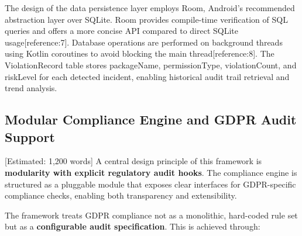 The design of the data persistence layer employs Room, Android's recommended abstraction layer over SQLite. Room provides compile-time verification of SQL queries and offers a more concise API compared to direct SQLite usage[reference:7]. Database operations are performed on background threads using Kotlin coroutines to avoid blocking the main thread[reference:8]. The ViolationRecord table stores packageName, permissionType, violationCount, and riskLevel for each detected incident, enabling historical audit trail retrieval and trend analysis.

\subsection{Modular Compliance Engine and GDPR Audit Support} [Estimated: 1,200 words]
A central design principle of this framework is \textbf{modularity with explicit regulatory audit hooks}. The compliance engine is structured as a pluggable module that exposes clear interfaces for GDPR-specific compliance checks, enabling both transparency and extensibility.

The framework treats GDPR compliance not as a monolithic, hard-coded rule set but as a \textbf{configurable audit specification}. This is achieved through:

